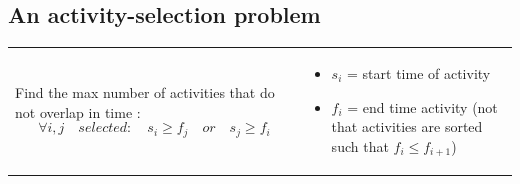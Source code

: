 


\subsection{An activity-selection problem}
\begin{tabular}{m{6cm}m{10cm}}
    Find the max number of activities that do not
    overlap in time : 
    $$\forall i,j \quad selected: \quad s_i \geq f_j  \quad or \quad s_j \geq f_i$$
    &
\begin{itemize}
    \item $s_i$ = start time of activity
    \item $f_i$ = end time activity (not that activities are 
        sorted such that $f_i \leq f_{i+1}$)
\end{itemize}
\end{tabular}

